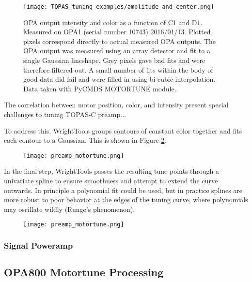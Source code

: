 \documentclass[11pt]{article}
\begin{document}
\begin{figure}
	\begin{centering}
		\texttt{[image: TOPAS\_tuning\_examples/amplitude\_and\_center.png]}
		\caption{OPA output intensity and color as a function of C1 and D1. Measured on OPA1 (serial number 10743) 2016/01/13. Plotted pixels correspond directly to actual measured OPA outputs. The OPA output was measured using an array detector and fit to a single Gaussian lineshape. Grey pixels gave bad fits and were therefore filtered out. A small number of fits within the body of good data did fail and were filled in using bi-cubic interpolation. Data taken with PyCMDS MOTORTUNE module.}
	\end{centering}
	\label{fig:TOPAS amplitude and center}
\end{figure}

The correlation between motor position, color, and intensity present special challenges to tuning TOPAS-C preamp...

To address this, WrightTools groups contours of constant color together and fits each contour to a Gaussian. This is shown in Figure \ref{fig:TOPAS contour fit}.

\begin{figure}
	\begin{centering}
		\texttt{[image: preamp\_motortune.png]}
		\caption{}
	\end{centering}
	\label{fig:TOPAS contour fit}
\end{figure}

In the final step, WrightTools passes the resulting tune points through a univariate spline to ensure smoothness and attempt to extend the curve outwards. In principle a polynomial fit could be used, but in practice splines are more robust to poor behavior at the edges of the tuning curve, where polynomials may oscillate wildly (Runge's phenomenon).

\begin{figure}
	\begin{centering}
		\texttt{[image: preamp\_motortune.png]}
		\caption{}
	\end{centering}
	\label{fig:TOPAS preamp motortune}
\end{figure}


\subsubsection{Signal Poweramp}

\subsection{OPA800 Motortune Processing}
\end{document}
